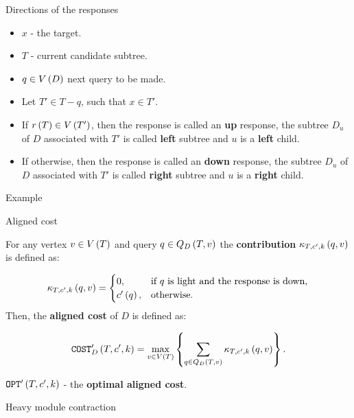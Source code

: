 \begin{frame}{Directions of the responses}
    \begin{itemize}
        \item $x$ - the target.
        \item $T$ - current candidate subtree.
        \item $q\in V\left( D \right)$ next query to be made.
        \pause
        \item Let $T'\in T-q$, such that $x\in T'$.
        \pause
        \item If $r\left( T \right)\in V\left( T' \right)$, then the response is called an \textbf{up} response, the subtree $D_u$ of $D$ associated with $T'$ is called \textbf{left} subtree and $u$ is a \textbf{left} child.
        \pause
        \item If otherwise, then the response is called an \textbf{down} response, the subtree $D_u$ of $D$ associated with $T'$ is called \textbf{right} subtree and $u$ is a \textbf{right} child.
    \end{itemize}
    
\end{frame}

\begin{frame}{Example}
    
\end{frame}

\begin{frame}{Aligned cost}

    For any vertex $v\in V\left( T \right)$ and query $q\in Q_{D}\left( T,v \right)$ the \textbf{contribution} $\kappa_{T,c',k}\left( q,v \right)$ is defined as:

    $$
\kappa_{T,c',k}\left( q, v \right)= \begin{cases}
    0, & \text{if $q$ is light and the response is down},\\
    c'\left( q \right), & \text{otherwise}.
\end{cases}
$$
\pause
Then, the \textbf{aligned cost} of $D$ is defined as:

$$
\texttt{COST}'_D\left( T,c',k \right)=\max_{v\in V\left( T \right)}\left\{ \sum_{q\in Q_D\left( T,v \right)}\kappa_{T,c', k}\left( q,v \right) \right\}.
$$

$\texttt{OPT}'\left( T,c',k \right)$ - the \textbf{optimal aligned cost}.
\end{frame}
\begin{frame}{Heavy module contraction}

\end{frame}


